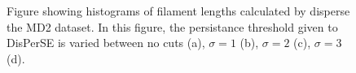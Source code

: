 \begin{figure}[H]
    \hspace{2em}%
    \hspace{2em}%
    \caption{Figure showing histograms of filament lengths calculated by disperse the MD2 dataset. In this figure, the persistance threshold given to DisPerSE is varied between no cuts (a), $\sigma=1$ (b), $\sigma=2$ (c), $\sigma=3$ (d).}
    \label{fig:histMD2}
\end{figure}
